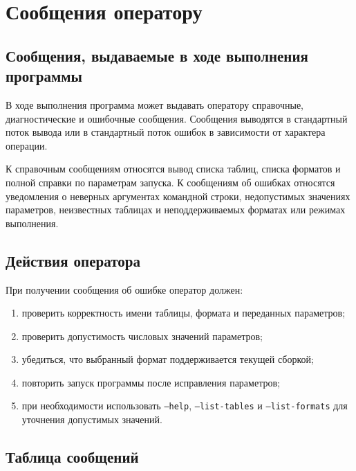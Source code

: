\section{Сообщения оператору}

\subsection{Сообщения, выдаваемые в ходе выполнения программы}

В ходе выполнения программа может выдавать оператору справочные, диагностические
и ошибочные сообщения. Сообщения выводятся в стандартный поток вывода или в
стандартный поток ошибок в зависимости от характера операции.

К справочным сообщениям относятся вывод списка таблиц, списка форматов и полной
справки по параметрам запуска. К сообщениям об ошибках относятся уведомления о
неверных аргументах командной строки, недопустимых значениях параметров,
неизвестных таблицах и неподдерживаемых форматах или режимах выполнения.

\subsection{Действия оператора}

При получении сообщения об ошибке оператор должен:
\begin{enumerate}
    \item проверить корректность имени таблицы, формата и переданных параметров;
    \item проверить допустимость числовых значений параметров;
    \item убедиться, что выбранный формат поддерживается текущей сборкой;
    \item повторить запуск программы после исправления параметров;
    \item при необходимости использовать \texttt{--help}, \texttt{--list-tables} и
    \texttt{--list-formats} для уточнения допустимых значений.
\end{enumerate}

\subsection{Таблица сообщений}

